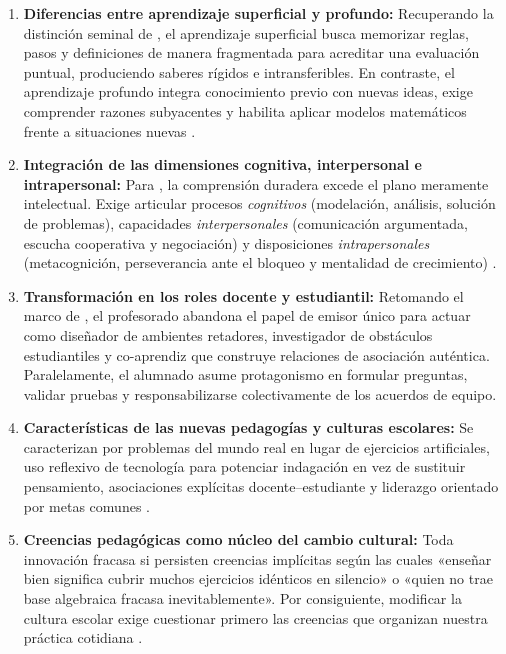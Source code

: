 \documentclass[spanish,letterpaper,oneside]{article}
\begin{document}
\begin{enumerate}
  \item \textbf{Diferencias entre aprendizaje superficial y profundo:} Recuperando la distinción seminal de \citet{marton1976qualitative}, el aprendizaje superficial busca memorizar reglas, pasos y definiciones de manera fragmentada para acreditar una evaluación puntual, produciendo saberes rígidos e intransferibles. En contraste, el aprendizaje profundo integra conocimiento previo con nuevas ideas, exige comprender razones subyacentes y habilita aplicar modelos matemáticos frente a situaciones nuevas \citep{sawyer2008optimizing}.
  \item \textbf{Integración de las dimensiones cognitiva, interpersonal e intrapersonal:} Para \citet{quiroga2022aprendizaje}, la comprensión duradera excede el plano meramente intelectual. Exige articular procesos \textit{cognitivos} (modelación, análisis, solución de problemas), capacidades \textit{interpersonales} (comunicación argumentada, escucha cooperativa y negociación) y disposiciones \textit{intrapersonales} (metacognición, perseverancia ante el bloqueo y mentalidad de crecimiento) \citep{schunk2012teorias}.
  \item \textbf{Transformación en los roles docente y estudiantil:} Retomando el marco de \citet{fullan2014rich}, el profesorado abandona el papel de emisor único para actuar como diseñador de ambientes retadores, investigador de obstáculos estudiantiles y co-aprendiz que construye relaciones de asociación auténtica. Paralelamente, el alumnado asume protagonismo en formular preguntas, validar pruebas y responsabilizarse colectivamente de los acuerdos de equipo.
  \item \textbf{Características de las nuevas pedagogías y culturas escolares:} Se caracterizan por problemas del mundo real en lugar de ejercicios artificiales, uso reflexivo de tecnología para potenciar indagación en vez de sustituir pensamiento, asociaciones explícitas docente--estudiante y liderazgo orientado por metas comunes \citep{rivas2017innovaciones}.
  \item \textbf{Creencias pedagógicas como núcleo del cambio cultural:} Toda innovación fracasa si persisten creencias implícitas según las cuales «enseñar bien significa cubrir muchos ejercicios idénticos en silencio» o «quien no trae base algebraica fracasa inevitablemente». Por consiguiente, modificar la cultura escolar exige cuestionar primero las creencias que organizan nuestra práctica cotidiana \citep{quiroga2022aprendizaje}.
\end{enumerate}
\end{document}
